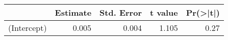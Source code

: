 
\begin{tabular}{l|r|r|r|r}
\hline
  & Estimate & Std. Error & t value & Pr(>|t|)\\
\hline
(Intercept) & 0.005 & 0.004 & 1.105 & 0.27\\
\hline
\end{tabular}
